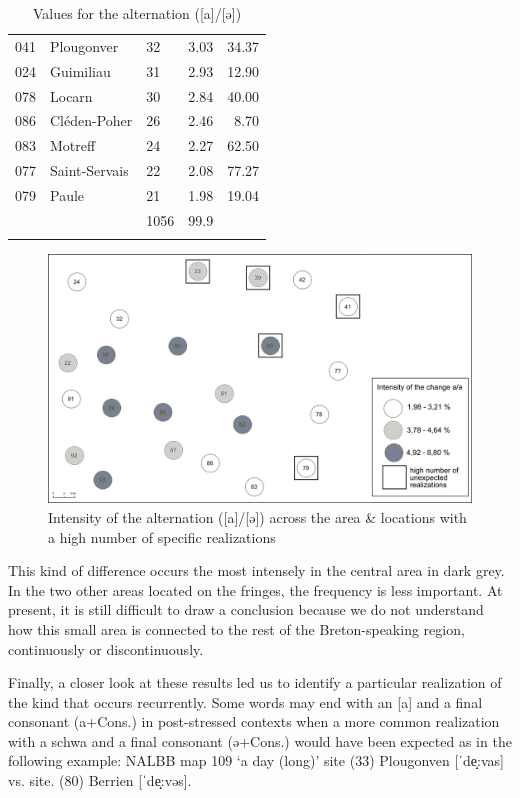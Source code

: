 \documentclass[output=paper]{LSP/langsci}
\begin{document}
\begin{table}
{\begin{tabular}{llllr}
 041 & Plougonver & 32 & 3.03 & 34.37\\
 024 & Guimiliau & 31 & 2.93 & 12.90\\
 078 & Locarn & 30 & 2.84 & 40.00\\
 086 & Cléden-Poher & 26 & 2.46 & 8.70\\
 083 & Motreff & 24 & 2.27 & 62.50\\
 077 & Saint-Servais & 22 & 2.08 & 77.27\\
 079 & Paule & 21 & 1.98 & 19.04\\
\midrule
&  & 1056 & 99.9 & \\
\lspbottomrule
\end{tabular}
}
\caption{Values for the alternation ([a]/[ə])}
\label{tab:brun:6}
\end{table}

\begin{figure}
\includegraphics[width=\textwidth]{illustrations/brun_etal_fig6}
\caption{Intensity of the alternation ([a]/[ə]) across the area \& locations with a high number of specific realizations}
\label{fig:6}
\end{figure}

This kind of difference occurs the most intensely in the central area in dark grey. In the two other areas located on the fringes, the frequency is less important. At present, it is still difficult to draw a conclusion because we do not understand how this small area is connected to the rest of the Breton-speaking region, continuously or discontinuously.

Finally, a closer look at these results led us to identify a particular realization of the kind that occurs recurrently. Some words may end with an [a] and a final consonant (a+Cons.) in post-stressed contexts when a more common realization with a schwa and a final consonant (ə+Cons.) would have been expected as in the following example: NALBB map 109 ‘a day (long)’ site (33) Plougonven [ˈde̝:vas] vs. site. (80) Berrien [ˈde̝:vəs].
 
\end{document}

